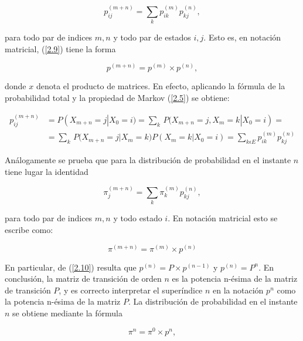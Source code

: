 		\begin{equation}
			p_{ ij }^{ (m+n) }=\sum _{ k }^{  }{ p_{ ik }^{ (m) }p_{ kj }^{ (n) } } ,     \label{2.9}
		\end{equation}
		
		para todo par de indices $m,n$ y todo par de estados $i,j$. Esto es, en notaci\'{o}n matricial, (\ref{2.9}) tiene la forma
		
		\begin{equation}
			p^{ (m+n) }=p^{ (m) }\times p^{(n) }, \label{2.10}
		\end{equation}
		
		donde $x$ denota el producto de matrices. En efecto, aplicando la f\'{o}rmula de la probabilidad total y la propiedad de Markov (\ref{2.5}) se obtiene: 
		
		\begin{align}
			p_{ij}^{(m+n)} &= P( X_{ m+n }=j| X_{ 0 }=i)=\sum _{ k\ }^{  }{ P( X_{ m+n } } =j, X_{ m }=k| X_{ 0 }=i)= \nonumber \\
			&=\sum _{ k\ }^{  }{ P( X_{ m+n } } =j| X_{ m }=k)P( X_{ m }=k| X_{ 0 }=i)=\sum _{ k\epsilon E  }^{  }{ p_{ ik }^{ (m) } } p_{ kj }^{ (n) }
		\end{align}
		
		An\'{a}logamente se prueba que para la distribuci\'{o}n de probabilidad en el instante $n$ tiene lugar la identidad
		
		\begin{equation}
			{ \pi  }_{ j }^{( m+n) }=\sum _{ k }^{  }{ { \pi  }_{ k }^{( m) } } p_{ kj }^{( n) } , \label{2.11}
		\end{equation}
		
		para todo par de indices $m,n$ y todo estado $i$. En notaci\'{o}n matricial esto se escribe como:
		
		\begin{equation}
			{ \pi  }^{ (m+n) }={ \pi  }^{ (m) }\times p^{(n) }\nonumber
		\end{equation} 
		
		En particular, de (\ref{2.10}) resulta que $p^{(n) }=P\times p^{ (n-1) }$ y  $p^{(n)}=P^{n}$. En conclusi\'{o}n, la matriz de transici\'{o}n de orden $n$ es la potencia n-\'{e}sima de la matriz de transici\'{o}n $P$, y es correcto interpretar el super\'{i}ndice $n$ en la notaci\'{o}n $p^{ n }$ como la potencia n-\'{e}sima de la matriz $P$. La distribuci\'{o}n de probabilidad en el instante $n$ se obtiene mediante la f\'{o}rmula
		
		\begin{equation}
			\pi^{n}=\pi^{0} \times p^{ n } ,   \label{2.12}
		\end{equation}
		
